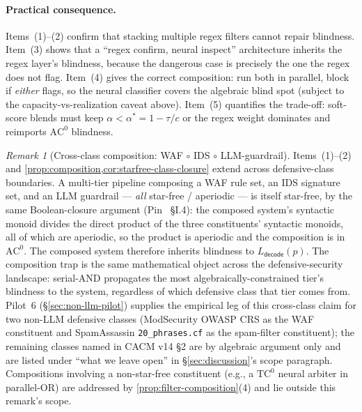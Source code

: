 \documentclass[letterpaper,twocolumn,10pt]{article}
\theoremstyle{definition}
\theoremstyle{remark}
\newtheorem{remark}[theorem]{Remark}
\begin{document}
\paragraph{Practical consequence.}
Items~(1)--(2) confirm that stacking multiple regex filters cannot repair
blindness.
Item~(3) shows that a ``regex confirm, neural inspect'' architecture
inherits the regex layer's blindness, because the dangerous case is
precisely the one the regex does not flag.
Item~(4) gives the correct composition: run both in parallel, block if
\emph{either} flags, so the neural classifier covers the algebraic blind
spot (subject to the capacity-vs-realization caveat above).
Item~(5) quantifies the trade-off: soft-score blends must keep
$\alpha < \alpha^* = 1 - \tau/c$ or the regex weight dominates and
reimports $\mathrm{AC}^0$ blindness.

\begin{remark}[Cross-class composition: WAF $\circ$ IDS $\circ$ LLM-guardrail]\label{rem:cross-class-composition}
Items~(1)--(2) and \cref{prop:composition,cor:starfree-class-closure}
extend across defensive-class boundaries. A multi-tier pipeline
composing a WAF rule set, an IDS signature set, and an LLM guardrail
--- \emph{all} star-free / aperiodic --- is itself star-free, by the
same Boolean-closure argument (Pin~\cite{pin1986} \S I.4): the
composed system's syntactic monoid divides the direct product of the
three constituents' syntactic monoids, all of which are aperiodic, so
the product is aperiodic and the composition is in $\mathrm{AC}^0$.
The composed system therefore inherits blindness to $L_{\mathsf{decode}}(p)$.
The composition trap is the same mathematical object across the
defensive-security landscape: serial-AND propagates the most
algebraically-constrained tier's blindness to the system, regardless of
which defensive class that tier comes from. Pilot~6
(\S\ref{sec:non-llm-pilot}) supplies the empirical leg of this cross-class
claim for two non-LLM defensive classes (ModSecurity OWASP CRS as the WAF
constituent and SpamAssassin \texttt{20\_phrases.cf} as the spam-filter
constituent); the remaining classes named in CACM v14 \S2 are by
algebraic argument only and are listed under ``what we leave open'' in
\S\ref{sec:discussion}'s scope paragraph.
Compositions involving a non-star-free constituent (e.g., a $\mathrm{TC}^0$
neural arbiter in parallel-OR) are addressed by
\cref{prop:filter-composition}(4) and lie outside this remark's scope.
\end{remark}
\end{document}
